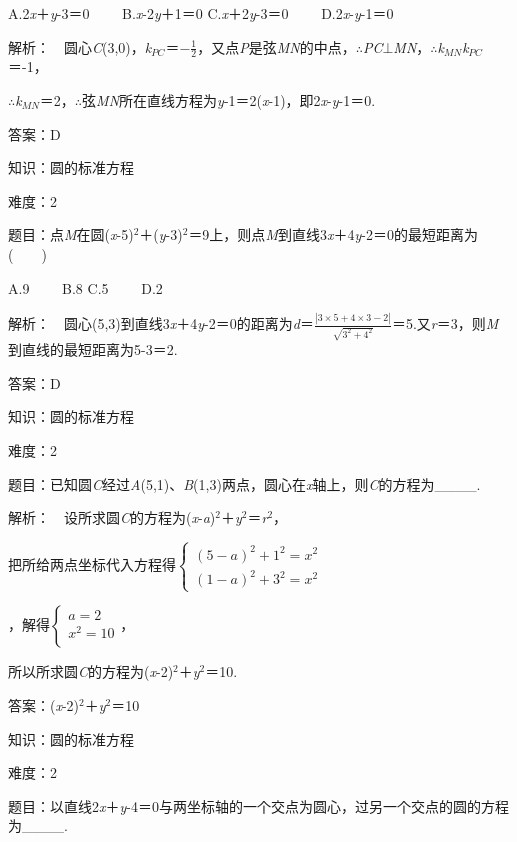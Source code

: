 \documentclass{article} %
\begin{document}
A.2\textit{x}＋\textit{y}-3＝0　　 B.\textit{x}-2\textit{y}＋1＝0 C.\textit{x}＋2\textit{y}-3＝0　　 D.2\textit{x}-\textit{y}-1＝0

解析：　圆心\textit{C}(3,0)，\textit{k${}_{PC}$}＝$-\frac{1}{2}$，又点\textit{P}是弦\textit{MN}的中点，$\mathrm{\therefore}$\textit{PC}$\mathrm{\bot}$\textit{MN}，$\mathrm{\therefore}$\textit{k${}_{MN}$k${}_{PC}$}＝-1，

$\mathrm{\therefore}$\textit{k${}_{MN}$}＝2，$\mathrm{\therefore}$弦\textit{MN}所在直线方程为\textit{y}-1＝2(\textit{x}-1)，即2\textit{x}-\textit{y}-1＝0.

答案：D

知识：圆的标准方程

难度：2

题目：点\textit{M}在圆(\textit{x}-5)${}^{2}$＋(\textit{y}-3)${}^{2}$＝9上，则点\textit{M}到直线3\textit{x}＋4\textit{y}-2＝0的最短距离为(　　)

A.9　　 B.8 C.5　　 D.2

解析：　圆心(5,3)到直线3\textit{x}＋4\textit{y}-2＝0的距离为\textit{d}＝$\frac{|3\times5+4\times3-2|}{\sqrt{3^2+4^2}}$＝5.又\textit{r}＝3，则\textit{M}到直线的最短距离为5-3＝2.

答案：D


知识：圆的标准方程

难度：2

题目：已知圆\textit{C}经过\textit{A}(5,1)、\textit{B}(1,3)两点，圆心在\textit{x}轴上，则\textit{C}的方程为\_\_\_\_.

解析：　设所求圆\textit{C}的方程为(\textit{x}-\textit{a})${}^{2}$＋\textit{y}${}^{2}$＝\textit{r}${}^{2}$，

把所给两点坐标代入方程得$\left\{\begin{array}{r} (5-a)^2+1^2=x^2\\ (1-a)^2+3^2=x^2 \end{array} \right.$

，解得$\left\{\begin{array}{r} a=2\\ x^2=10\\ \end{array} \right.$，

所以所求圆\textit{C}的方程为(\textit{x}-2)${}^{2}$＋\textit{y}${}^{2}$＝10.

答案：(\textit{x}-2)${}^{2}$＋\textit{y}${}^{2}$＝10

知识：圆的标准方程

难度：2

题目：以直线2\textit{x}＋\textit{y}-4＝0与两坐标轴的一个交点为圆心，过另一个交点的圆的方程为\_\_\_\_.
\end{document}
